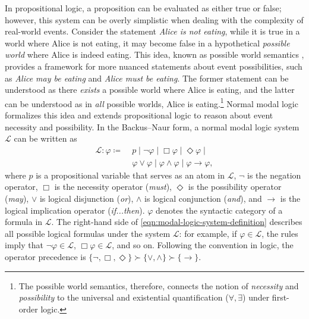 In propositional logic, a proposition can be evaluated as either true or false; however, this system can be overly simplistic when dealing with the complexity of real-world events.
Consider the statement \textit{Alice is not eating}, while it is true in a world where Alice is not eating, it may become false in a hypothetical \textit{possible world} where Alice is indeed eating.
This idea, known as possible world semantics \citep{kripkeCompletenessTheoremModal1959}, provides a framework for more nuanced statements about event possibilities, such as \textit{Alice may be eating} and \textit{Alice must be eating}.
The former statement can be understood as there \textit{exists} a possible world where Alice is eating, and the latter can be understood as in \textit{all} possible worlds, Alice is eating.\footnote{
    The possible world semantics, therefore, connects the notion of \textit{necessity} and \textit{possibility} to the universal and existential quantification ($\forall, \exists$) under first-order logic.
}
Normal modal logic \citep{kripkeSemanticalAnalysisModal1963} formalizes this idea and extends propositional logic to reason about event necessity and possibility.
In the Backus--Naur form, a normal modal logic system $\mathcal{L}$ can be written as
\begin{align}
    \mathcal{L} : \varphi
    \coloneqq\; &
    p \mid
    \lnot \varphi  \mid
    \Box \varphi  \mid
    \Diamond \varphi  \mid \nonumber          \\
                & \varphi  \lor \varphi  \mid
    \varphi \land \varphi  \mid
    \varphi \to \varphi,
    \label{eqn:modal-logic-system-definition}
\end{align}
where $p$ is a propositional variable that serves as an atom in $\mathcal{L}$, $\lnot$ is the negation operator, $\Box$ is the necessity operator (\textit{must}), $\Diamond$ is the possibility operator (\textit{may}), $\lor$ is logical disjunction (\textit{or}), $\land$ is logical conjunction (\textit{and}), and $\to$ is the logical implication operator (\textit{if...then}).
$\varphi$ denotes the syntactic category of a formula in $\mathcal{L}$.
The right-hand side of \cref{eqn:modal-logic-system-definition} describes all possible logical formulas under the system $\mathcal{L}$: for example, if $\varphi \in \mathcal{L}$, the rules imply that $\lnot \varphi \in \mathcal{L}$, $\Box \varphi \in \mathcal{L}$, and so on.
Following the convention in logic, the operator precedence is $\{\lnot, \Box, \Diamond\} \succ \{\lor, \land\} \succ \{\to\}$.

